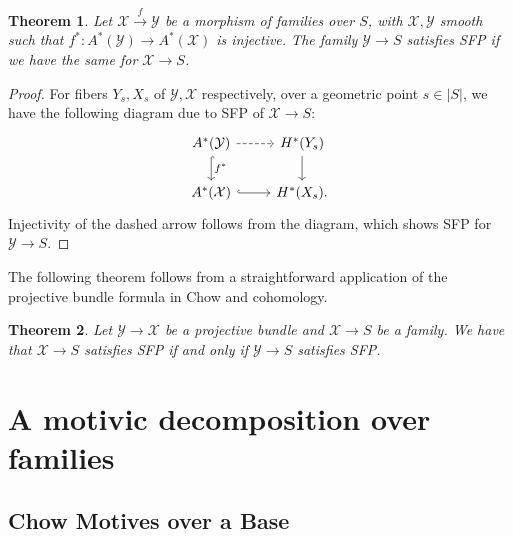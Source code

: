 \documentclass[11pt]{amsart}
\newtheorem{theorem}{Theorem}[section]
\theoremstyle{definition}
\newcommand{\ri}{\rightarrow}
\begin{document}
\begin{theorem}\label{thm:inj-sfp}
    Let $\mathcal{X}\xrightarrow{f}\mathcal{Y}$ be a morphism of families over $S$, with $\mathcal{X},\mathcal{Y}$ smooth such that $f^*:A^*(\mathcal{Y})\ri A^*(\mathcal{X})$ is injective. The family $\mathcal{Y}\ri S$ satisfies SFP if we have the same for $\mathcal{X}\ri S$.
\end{theorem}
\begin{proof}
For fibers $Y_s,X_s$ of $\mathcal{Y},\mathcal{X}$ respectively, over a geometric point $s\in |S|$, we have the following diagram due to SFP of $\mathcal{X}\ri S$:
$$\begin{tikzcd}
A^*(\mathcal{Y})\ar[r, dashed]\ar[d,"f^*", hook]& H^*(Y_s)\ar[d]\\
A^*(\mathcal{X})\ar[r, hook]& H^*(X_s).
\end{tikzcd}
$$
Injectivity of the dashed arrow follows from the diagram, which shows SFP for $\mathcal{Y}\ri S$.
\end{proof}


The following theorem follows from a straightforward application of the projective bundle formula in Chow and cohomology.
\begin{theorem}\label{thm:sfp-proj}
Let $\mathcal{Y}\ri \mathcal{X}$ be a projective bundle and $\mathcal{X}\ri S$ be a family. 
We have that $\mathcal{X}\ri S$ satisfies SFP if and only if $\mathcal{Y}\ri S$ satisfies SFP.
\end{theorem}


\section{A motivic decomposition over families}\label{sec:motive-families}


\subsection{Chow Motives over a Base}
\end{document}
